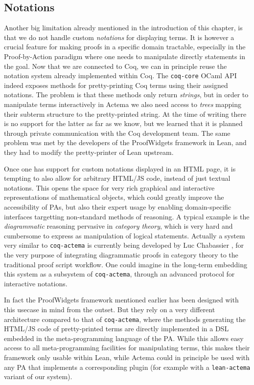 \subsection{Notations}

Another big limitation already mentioned in the introduction of this chapter, is
that we do not handle custom \emph{notations} for displaying
terms. It is however a crucial feature for making proofs in a specific
domain tractable, especially in the Proof-by-Action paradigm where one needs to
manipulate directly statements in the goal. Now that we are connected to Coq, we
can in principle reuse the notation system already implemented within Coq. The
\texttt{coq-core} OCaml API indeed exposes methods for pretty-printing Coq terms
using their assigned notations. The problem is that these methods only return
\emph{strings}, but in order to manipulate terms interactively in Actema we also
need access to \emph{trees} mapping their subterm structure to the
pretty-printed string. At the time of writing there is no support for the latter
as far as we know, but we learned that it is planned through private
communication with the Coq development team. The same problem was met by the
developers of the ProofWidgets framework in Lean, and they had to modify the
pretty-printer of Lean upstream.

Once one has support for custom notations displayed in an HTML page, it is
tempting to also allow for arbitrary HTML/JS code, instead of just textual
notations. This opens the space for very rich graphical and interactive
representations of mathematical objects, which could greatly improve the
accessibility of PAs, but also their expert usage by enabling domain-specific
interfaces targetting non-standard methods of reasoning. A typical example is
the \emph{diagrammatic} reasoning pervasive in \emph{category theory}, which is
very hard and cumbersome to express as manipulation of logical statements.
Actually a system very similar to \texttt{coq-actema} is currently being
developed by Luc Chabassier \cite{LucTalk}, for the very purpose of integrating
diagrammatic proofs in category theory to the traditional proof script workflow.
One could imagine in the long-term embedding this system as a subsystem of
\texttt{coq-actema}, through an advanced protocol for interactive notations.

In fact the ProofWidgets framework mentioned earlier has been designed with this
usecase in mind from the outset. But they rely on a very different architecture
compared to that of \texttt{coq-actema}, where the methods generating the
HTML/JS code of pretty-printed terms are directly implemented in a DSL embedded
in the meta-programming language of the PA. While this allows easy access to all
meta-programming facilities for manipulating terms, this makes their framework
only usable within Lean, while Actema could in principle be used with any PA
that implements a corresponding plugin (for example with a \texttt{lean-actema}
variant of our system).

